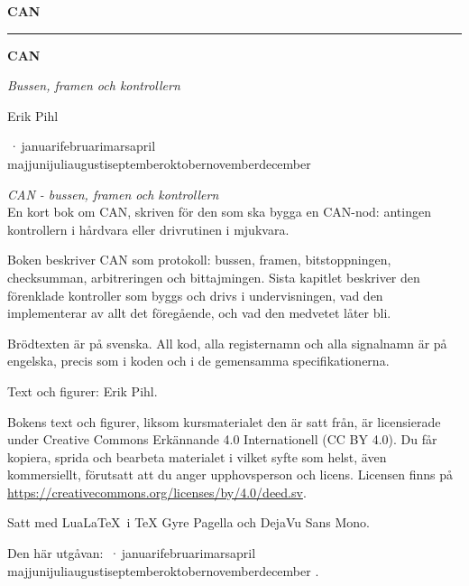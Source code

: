 \providecommand{\bookversion}{}
\newcommand{\bookdate}{\number\day\space\ifcase\month\or januari\or februari\or mars\or april\or
  maj\or juni\or juli\or augusti\or september\or oktober\or november\or december\fi\space
  \number\year}
\newcommand{\bookedition}{\ifx\bookversion\empty\else\bookversion\,·\,\fi\bookdate}

\thispagestyle{empty}
\vspace*{2.2in}
\begin{flushright}
  {\Large\bfseries CAN}
\end{flushright}
\cleardoublepage

\thispagestyle{empty}
\vspace*{1.1in}
\begin{flushleft}
  {\color{accent}\rule{0.9in}{2.5pt}}\par\vspace{1.4ex}
  {\fontsize{32}{38}\selectfont\bfseries CAN\par}
  \vspace{2.2ex}
  {\Large\itshape Bussen, framen och kontrollern\par}
  \vspace{1.2in}
  {\large Erik Pihl\par}
  \vfill
  \vspace{0.6ex}
  {\small\color{muted} \bookedition\par}
\end{flushleft}
\newpage

\thispagestyle{empty}
\vspace*{\fill}
{\small
\noindent\textit{CAN - bussen, framen och kontrollern}\\
En kort bok om CAN, skriven för den som ska bygga en CAN-nod: antingen kontrollern i hårdvara
eller drivrutinen i mjukvara.

\medskip
\noindent Boken beskriver CAN som protokoll: bussen, framen, bitstoppningen, checksumman,
arbitreringen och bittajmingen. Sista kapitlet beskriver den förenklade kontroller som byggs och
drivs i undervisningen, vad den implementerar av allt det föregående, och vad den medvetet låter
bli.

\medskip
\noindent Brödtexten är på svenska. All kod, alla registernamn och alla signalnamn är på
engelska, precis som i koden och i de gemensamma specifikationerna.

\medskip
\noindent Text och figurer: Erik Pihl.

\medskip
\noindent Bokens text och figurer, liksom kursmaterialet den är satt från, är licensierade under
Creative Commons Erkännande 4.0 Internationell (CC BY 4.0). Du får kopiera, sprida och bearbeta
materialet i vilket syfte som helst, även kommersiellt, förutsatt att du anger upphovsperson och
licens. Licensen finns på \url{https://creativecommons.org/licenses/by/4.0/deed.sv}.

\medskip
\noindent Satt med Lua\LaTeX\ i TeX Gyre Pagella och DejaVu Sans Mono.

\medskip
\noindent\textcolor{muted}{Den här utgåvan: \bookedition.}
\par}
\cleardoublepage
